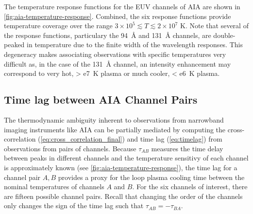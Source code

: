 The temperature response functions for the EUV channels of AIA are shown in \autoref{fig:aia-temperature-response}. Combined, the six response functions provide temperature coverage over the range $3\times10^5\lesssim T\lesssim2\times10^7$ \si{\kelvin}. Note that several of the response functions, particulary the \SI{94}{\angstrom} and \SI{131}{\angstrom} channels, are double-peaked in temperature due to the finite width of the wavelength responses. This degeneracy makes associating observations with specific temperatures very difficult as, in the case of the \SI{131}{\angstrom} channel, an intensity enhancement may correspond to very hot, \SI{> e7}{\kelvin} plasma or much cooler, \SI{< e6}{\kelvin} plasma.

\subsection{Time lag between AIA Channel Pairs}\label{subsec:timelag_aia}

The thermodynamic ambiguity inherent to observations from narrowband imaging instruments like AIA can be partially mediated by computing the cross-correlation (\autoref{eq:cross_correlation_final}) and time lag (\autoref{eq:timelag}) from observations from pairs of channels. Because $\tau_{AB}$ measures the time delay between peaks in different channels and the temperature sensitivy of each channel is approximately known (see \autoref{fig:aia-temperature-response}), the time lag for a channel pair $A,B$ provides a proxy for the loop plasma cooling time between the nominal temperatures of channels $A$ and $B$. For the six channels of interest, there are fifteen possible channel pairs. Recall that changing the order of the channels only changes the sign of the time lag such that $\tau_{AB}=-\tau_{BA}$.

